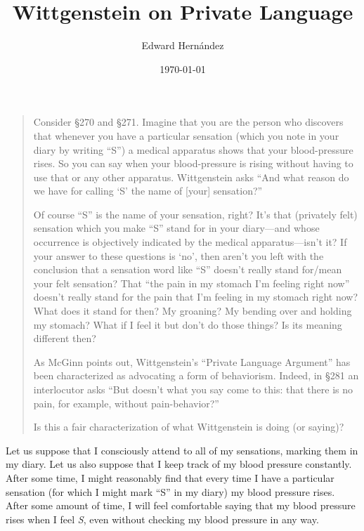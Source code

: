 \documentclass[doc,12pt,apacite,biblatex]{apa6}
\begin{document}
\title{Wittgenstein on Private Language}
\author{Edward Hern\'{a}ndez}
\date{\today}

\maketitle

\vspace{-20pt}
\begin{quote}
	Consider \S 270 and \S 271.  Imagine that you are the person who discovers
	that whenever you have a particular sensation (which you note in your diary
	by writing ``S'') a medical apparatus shows that your blood-pressure rises.
	So you can say when your blood-pressure is rising without having to use
	that or any other apparatus. Wittgenstein asks ``And what reason do we have
	for calling `S' the name of [your] sensation?''

	Of course ``S'' is the name of your sensation, right?  It's that (privately
	felt) sensation which you make ``S'' stand for in your diary---and whose
	occurrence is objectively indicated by the medical apparatus---isn't it?
	If your answer to these questions is `no', then aren't you left with the
	conclusion that a sensation word like ``S'' doesn't really stand for/mean
	your felt sensation?  That ``the pain in my stomach I'm feeling right now''
	doesn't really stand for the pain that I'm feeling in my stomach right now?
	What does it stand for then?  My groaning?  My bending over and holding my
	stomach?  What if I feel it but don't do those things?  Is its meaning
	different then?

	As McGinn points out, Wittgenstein's ``Private Language Argument'' has been
	characterized as advocating a form of behaviorism.  Indeed, in \S 281 an
	interlocutor asks ``But doesn't what you say come to this: that there is no
	pain, for example, without pain-behavior?''

	Is this a fair characterization of what Wittgenstein is doing (or saying)?
\end{quote}
\clearpage

Let us suppose that I consciously attend to all of my sensations, marking them
in my diary.
Let us also suppose that I keep track of my blood pressure constantly. After
some time, I might reasonably find that every time I have a particular
sensation (for which I might mark ``S'' in my diary) my blood pressure rises.
After some amount of time, I will feel comfortable saying that my blood
pressure rises when I feel \textit{S},
%
even without checking my blood pressure in any way.
\end{document}
